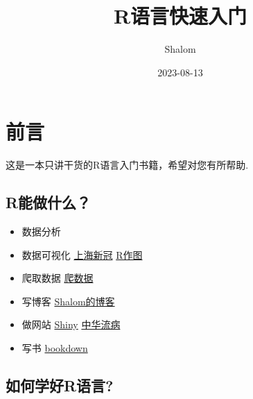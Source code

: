 \documentclass[
  letterpaper,
  DIV=11,
  numbers=noendperiod]{scrreprt}
\title{R语言快速入门}
\author{Shalom}
\date{2023-08-13}
\renewcommand*\contentsname{Table of contents}
\newcommand\contentsname{Table of contents}
\begin{document}
\maketitle
\ifdefined\Shaded\renewenvironment{Shaded}{\begin{tcolorbox}[breakable, sharp corners, boxrule=0pt, enhanced, borderline west={3pt}{0pt}{shadecolor}, interior hidden, frame hidden]}{\end{tcolorbox}}\fi

\renewcommand*\contentsname{Table of contents}
{
\hypersetup{linkcolor=}
\setcounter{tocdepth}{2}
\tableofcontents
}

\hypertarget{ux524dux8a00}{%
\chapter*{前言}\label{ux524dux8a00}}


这是一本只讲干货的R语言入门书籍，希望对您有所帮助.

\hypertarget{rux80fdux505aux4ec0ux4e48}{%
\section*{R能做什么？}\label{rux80fdux505aux4ec0ux4e48}}


\begin{itemize}
\item
  数据分析
\item
  数据可视化 \href{https://rrr.is/covid}{上海新冠}
  \href{https://chart.rlearner.com}{R作图}
\item
  爬取数据 \href{https://blog.rlearner.com/r/rvest-base.html}{爬数据}
\item
  写博客 \href{https://blog.rlearner.com}{Shalom的博客}
\item
  做网站 \href{https://shiny.posit.co/r/gallery/}{Shiny}
  \href{https://learn-r.shinyapps.io/epi-china/}{中华流病}
\item
  写书 \href{https://bookdown.org/}{bookdown}
\end{itemize}

\hypertarget{ux5982ux4f55ux5b66ux597drux8bedux8a00}{%
\section*{如何学好R语言?}\label{ux5982ux4f55ux5b66ux597drux8bedux8a00}}
\end{document}
